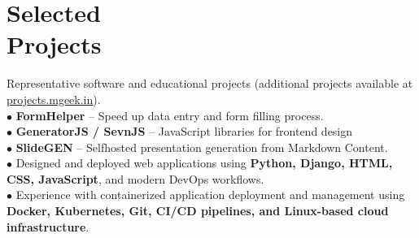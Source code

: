 \vspace{-2.5em}
\section{Selected\\Projects}
Representative software and educational projects (additional projects available at \href{https://projects.mgeek.in}{projects.mgeek.in}).\\
$\bullet$ \textbf{FormHelper} -- Speed up data entry and form filling process.\\
$\bullet$ \textbf{GeneratorJS / SevnJS} -- JavaScript libraries for frontend design\\
$\bullet$ \textbf{SlideGEN} -- Selfhosted presentation generation from Markdown Content.\\
$\bullet$ Designed and deployed web applications using \textbf{Python, Django, HTML, CSS, JavaScript}, and modern DevOps workflows.\\
$\bullet$ Experience with containerized application deployment and management using \textbf{Docker, Kubernetes, Git, CI/CD pipelines, and Linux-based cloud infrastructure}.
\sectionline
